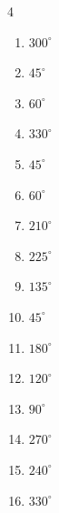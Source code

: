 \begin{multicols}{4}
\begin{enumerate}
  \item $\displaystyle 300^{\circ}$

  \item $\displaystyle 45^{\circ}$

  \item $\displaystyle 60^{\circ}$

  \item $\displaystyle 330^{\circ}$

  \item $\displaystyle 45^{\circ}$

  \item $\displaystyle 60^{\circ}$

\columnbreak %

  \item $\displaystyle 210^{\circ}$

  \item $\displaystyle 225^{\circ}$

  \item $\displaystyle 135^{\circ}$

  \item $\displaystyle 45^{\circ}$

  \item $\displaystyle 180^{\circ}$
        \phantom{$\displaystyle =\pi$}

  \item $\displaystyle 120^{\circ}$

  \item $\displaystyle 90^{\circ}$

  \item $\displaystyle 270^{\circ}$

  \item $\displaystyle 240^{\circ}$

  \item $\displaystyle 330^{\circ}$


\end{enumerate}
\end{multicols}
